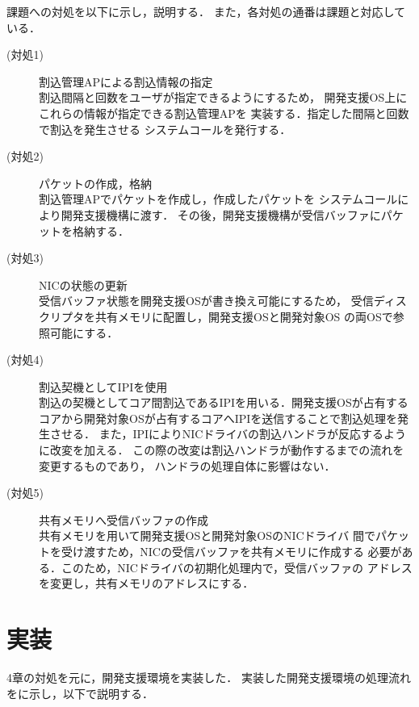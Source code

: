 \documentclass[submit,techreq,noauthor,dvipdfmx]{ipsj}
\begin{document}
課題への対処を以下に示し，説明する．
また，各対処の通番は課題と対応している．

\begin{description}
    \item[(対処1)] 割込管理APによる割込情報の指定\\
        割込間隔と回数をユーザが指定できるようにするため，
        開発支援OS上にこれらの情報が指定できる割込管理APを
        実装する．指定した間隔と回数で割込を発生させる
        システムコールを発行する．
    \item[(対処2)] パケットの作成，格納\\
        割込管理APでパケットを作成し，作成したパケットを
        システムコールにより開発支援機構に渡す．
        その後，開発支援機構が受信バッファにパケットを格納する．
    \item[(対処3)] NICの状態の更新\\
        受信バッファ状態を開発支援OSが書き換え可能にするため，
        受信ディスクリプタを共有メモリに配置し，開発支援OSと開発対象OS
        の両OSで参照可能にする．
    \item[(対処4)] 割込契機としてIPIを使用\\
        割込の契機としてコア間割込であるIPIを用いる．開発支援OSが占有する
        コアから開発対象OSが占有するコアへIPIを送信することで割込処理を発生させる．
        また，IPIによりNICドライバの割込ハンドラが反応するように改変を加える．
        この際の改変は割込ハンドラが動作するまでの流れを変更するものであり，
        ハンドラの処理自体に影響はない．
    \item[(対処5)] 共有メモリへ受信バッファの作成\\
        共有メモリを用いて開発支援OSと開発対象OSのNICドライバ
        間でパケットを受け渡すため，NICの受信バッファを共有メモリに作成する
        必要がある．このため，NICドライバの初期化処理内で，受信バッファの
        アドレスを変更し，共有メモリのアドレスにする．
\end{description}

\section{実装}\label{chap:implemantation}

4章の対処を元に，開発支援環境を実装した．
実装した開発支援環境の処理流れをに示し，以下で説明する．
\end{document}

